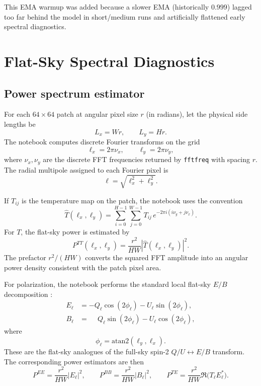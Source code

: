 \documentclass[11pt]{article}
\begin{document}
This EMA warmup was added because a slower EMA (historically \(0.999\)) lagged too far behind the model in short/medium runs and artificially flattened early spectral diagnostics.

\section{Flat-Sky Spectral Diagnostics}

\subsection{Power spectrum estimator}

For each \(64\times 64\) patch at angular pixel size \(r\) (in radians), let the physical side lengths be
\begin{equation}
  L_x = Wr,\qquad L_y = Hr.
\end{equation}
The notebook computes discrete Fourier transforms on the grid
\begin{equation}
  \ell_x = 2\pi \nu_x,\qquad \ell_y = 2\pi \nu_y,
\end{equation}
where \(\nu_x,\nu_y\) are the discrete FFT frequencies returned by \texttt{fftfreq} with spacing \(r\). The radial multipole assigned to each Fourier pixel is
\begin{equation}
  \ell = \sqrt{\ell_x^2 + \ell_y^2}.
\end{equation}

If \(T_{ij}\) is the temperature map on the patch, the notebook uses the convention
\begin{equation}
  \widehat T(\ell_x,\ell_y)
  =
  \sum_{i=0}^{H-1}\sum_{j=0}^{W-1}
  T_{ij}\,
  e^{-2\pi i\left(i\nu_y+j\nu_x\right)}.
\end{equation}
For \(T\), the flat-sky power is estimated by
\begin{equation}
  P^{TT}(\ell_x,\ell_y)
  =
  \frac{r^2}{HW}
  |\widehat T(\ell_x,\ell_y)|^2.
\end{equation}
The prefactor \(r^2/(HW)\) converts the squared FFT amplitude into an angular power density consistent with the patch pixel area.

For polarization, the notebook performs the standard local flat-sky \(E/B\) decomposition \cite{zaldarriaga1997,kamionkowski1997}:
\begin{align}
  E_{\bm{\ell}} &= -Q_{\bm{\ell}} \cos(2\phi_{\bm{\ell}}) - U_{\bm{\ell}} \sin(2\phi_{\bm{\ell}}),\\
  B_{\bm{\ell}} &= \phantom{-}Q_{\bm{\ell}} \sin(2\phi_{\bm{\ell}}) - U_{\bm{\ell}} \cos(2\phi_{\bm{\ell}}),
\end{align}
where
\begin{equation}
  \phi_{\bm{\ell}} = \mathrm{atan2}(\ell_y,\ell_x).
\end{equation}
These are the flat-sky analogues of the full-sky spin-2 \(Q/U \leftrightarrow E/B\) transform. The corresponding power estimators are then
\begin{equation}
  P^{EE} = \frac{r^2}{HW}|E_{\bm{\ell}}|^2,\qquad
  P^{BB} = \frac{r^2}{HW}|B_{\bm{\ell}}|^2,\qquad
  P^{TE} = \frac{r^2}{HW}\Re\bigl(T_{\bm{\ell}} E_{\bm{\ell}}^\ast\bigr).
\end{equation}
\end{document}
